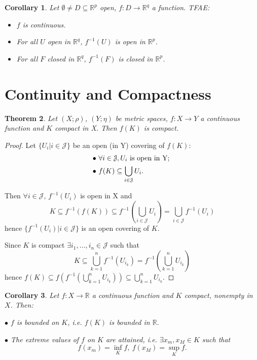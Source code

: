 \documentclass[12pt]{amsbook}
\newtheorem{theorem}{Theorem}[section]
\newtheorem{corollary}[theorem]{Corollary}
\theoremstyle{definition}
\newcommand{\RR}{{\mathbb R}}
\newcommand{\cJ}{{\mathcal J}}
\newcommand{\ra}{\rightarrow} %
\begin{document}
\begin{corollary} 

Let $\emptyset \neq D \subseteq \RR^p$ open, $f: D \ra \RR^q$ a function. TFAE:
\begin{itemize}
\item[(i)] $f$ is continuous.
\item[(ii)] For all $U$ open in $\RR^q$, $f^{-1}(U)$ is open in $\RR^p$.
\item[(iii)] For all $F$ closed in $\RR^q$, $f^{-1}(F)$ is closed in $\RR^p$.
\end{itemize}
\end{corollary}

\section{Continuity and Compactness}

\begin{theorem} 
Let $(X; \rho)$, $(Y; \eta)$ be metric spaces, $f: X \ra Y$ a continuous function and $K$ compact in X. Then $f(K)$ is compact.
\end{theorem}
\begin{proof}

Let $\{U_i | i \in \cJ\}$ be an open (in Y) covering of $f(K)$: 
\begin{align*}
\bullet \ & \forall i \in \cJ, U_i \textup{ is open in Y; } \\
\bullet \ & f(K) \subseteq \bigcup_{i \in \cJ} U_i.
\end{align*}

Then $\forall i \in \cJ$, $f^{-1}(U_i)$ is open in X and
\begin{equation*}
K \subseteq f^{-1}(f(K)) \subseteq f^{-1}(\bigcup_{i \in \cJ} U_i) =  \bigcup_{i \in \cJ} f^{-1}(U_i)
\end{equation*}
hence $\{f^{-1}(U_i) | i \in \cJ\}$ is an open covering of $K$.

Since $K$ is compact $\exists i_1, \ldots, i_n \in \cJ$ such that
\begin{equation*}
K \subseteq  \bigcup_{k=1}^n f^{-1}(U_{i_k}) = f^{-1}(\bigcup_{k=1}^n U_{i_k})
\end{equation*}
hence $f(K) \subseteq f(f^{-1}(\bigcup_{k=1}^n U_{i_k})) \subseteq \bigcup_{k=1}^n U_{i_k}$.
\end{proof}

\begin{corollary}
Let $f: X \ra \RR$ a continuous function and $K$ compact, nonempty in $X$. Then:

$\bullet$ $f$ is bounded on $K$, i.e. $f(K)$ is bounded in $\RR$.

$\bullet$ The extreme values of $f$ on $K$ are attained, i.e. $\exists x_m, x_M \in K$ such that 
\begin{equation*} f(x_m) = \inf_K f, \ f(x_M) = \sup_K f.\end{equation*}
\end{corollary}
\end{document}
